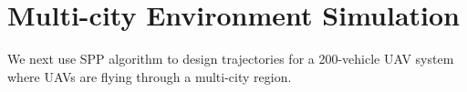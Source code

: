\section{Multi-city Environment Simulation \label{sec:bayArea_sim}}
We next use SPP algorithm to design trajectories for a 200-vehicle UAV system where UAVs are flying through a multi-city region.